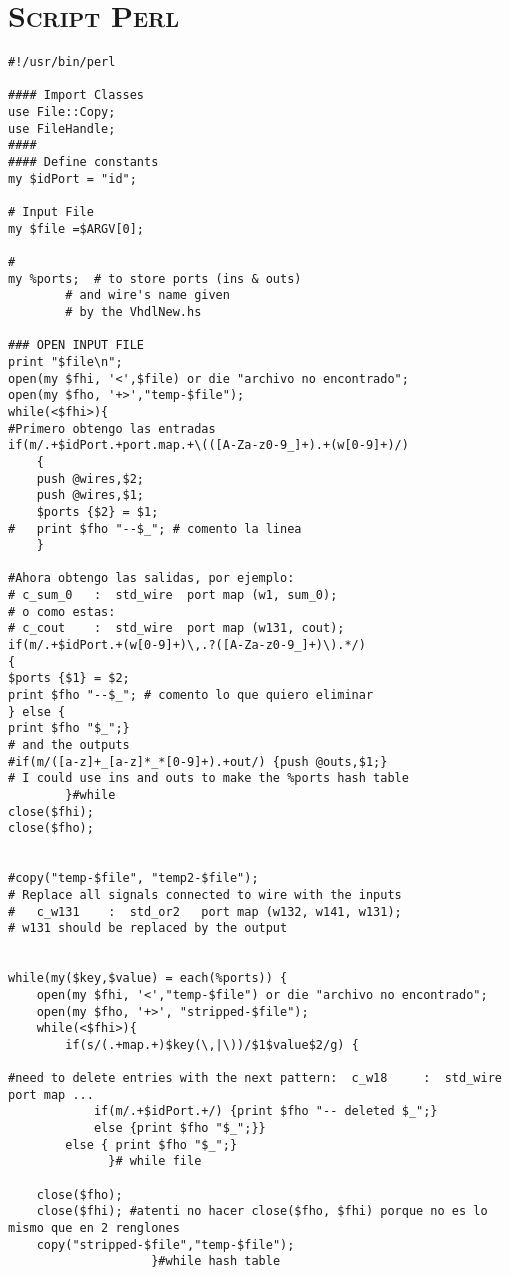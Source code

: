 \chapter{\textsc{ Script Perl }}\label{vhdlNetlist}
\small{
\begin{verbatim}
#!/usr/bin/perl 

#### Import Classes
use File::Copy;
use FileHandle;
####
#### Define constants
my $idPort = "id";

# Input File
my $file =$ARGV[0];

#
my %ports;	# to store ports (ins & outs)
		# and wire's name given
		# by the VhdlNew.hs

### OPEN INPUT FILE 
print "$file\n";
open(my $fhi, '<',$file) or die "archivo no encontrado";
open(my $fho, '+>',"temp-$file");
while(<$fhi>){
#Primero obtengo las entradas
if(m/.+$idPort.+port.map.+\(([A-Za-z0-9_]+).+(w[0-9]+)/)
	{
	push @wires,$2;
	push @wires,$1;
	$ports {$2} = $1;
#	print $fho "--$_"; # comento la linea
	} 

#Ahora obtengo las salidas, por ejemplo:
# c_sum_0   :  std_wire  port map (w1, sum_0);
# o como estas:
# c_cout    :  std_wire  port map (w131, cout);
if(m/.+$idPort.+(w[0-9]+)\,.?([A-Za-z0-9_]+)\).*/)                          
{
$ports {$1} = $2;
print $fho "--$_"; # comento lo que quiero eliminar
} else {
print $fho "$_";}
# and the outputs
#if(m/([a-z]+_[a-z]*_*[0-9]+).+out/) {push @outs,$1;}
# I could use ins and outs to make the %ports hash table
		}#while
close($fhi);
close($fho);


#copy("temp-$file", "temp2-$file");
# Replace all signals connected to wire with the inputs 
#   c_w131    :  std_or2   port map (w132, w141, w131);
# w131 should be replaced by the output


while(my($key,$value) = each(%ports)) {
	open(my $fhi, '<',"temp-$file") or die "archivo no encontrado";
	open(my $fho, '+>', "stripped-$file");
	while(<$fhi>){
		if(s/(.+map.+)$key(\,|\))/$1$value$2/g) {

#need to delete entries with the next pattern:  c_w18     :  std_wire  port map ...
			if(m/.+$idPort.+/) {print $fho "-- deleted $_";}
			else {print $fho "$_";}}
		else { print $fho "$_";}
		      }# while file 

	close($fho);
	close($fhi); #atenti no hacer close($fho, $fhi) porque no es lo mismo que en 2 renglones
	copy("stripped-$file","temp-$file");
					}#while hash table
\end{verbatim}
} %
